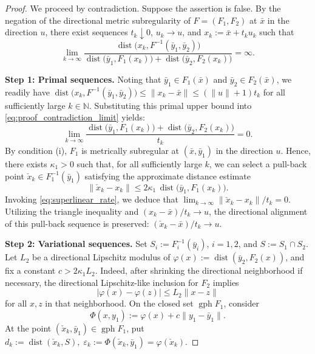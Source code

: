 \documentclass[12pt,twoside,reqno]{amsart}
\theoremstyle{definition}
\numberwithin{equation}{section}
\begin{document}
\begin{proof}
We proceed by contradiction. Suppose the assertion is false.  
By the negation of the directional metric subregularity of $F = (F_1, F_2)$ at $\bar{x}$ in the direction $u$, there exist sequences $t_k \downarrow 0$, $u_k \to u$, and $x_k := \bar{x} + t_k u_k$ such that 
\begin{equation} \label{eq:proof_contradiction_limit}
    \lim_{k \to \infty} \frac{\operatorname{dist}\big(x_k, F^{-1}(\bar{y}_1, \bar{y}_2)\big)}{\operatorname{dist}\big(\bar{y}_1, F_1(x_k)\big) + \operatorname{dist}\big(\bar{y}_2, F_2(x_k)\big)} = \infty.
\end{equation}

\textbf{Step 1: Primal sequences.} 
Noting that $\bar{y}_1 \in F_1(\bar{x})$ and $\bar{y}_2 \in F_2(\bar{x})$, we readily have $\operatorname{dist}\big(x_k, F^{-1}(\bar{y}_1, \bar{y}_2)\big) \le \|x_k - \bar{x}\| \le (\|u\| + 1)t_k$ for all sufficiently large $k \in \mathbb{N}$. Substituting this primal upper bound into \eqref{eq:proof_contradiction_limit} yields: 
\begin{equation} \label{eq:superlinear_rate}
    \lim_{k \to \infty} \frac{\operatorname{dist}\big(\bar{y}_1, F_1(x_k)\big) + \operatorname{dist}\big(\bar{y}_2, F_2(x_k)\big)}{t_k} = 0.
\end{equation}
By condition (i), $F_1$ is metrically subregular at $(\bar{x}, \bar{y}_1)$ in the direction $u$. Hence, there exists $\kappa_1 > 0$ such that, for all sufficiently large $k$, we can select a pull-back point $\check{x}_k \in F_1^{-1}(\bar{y}_1)$ satisfying the approximate distance estimate
\begin{equation} \label{eq:pullback_estimate}
    \|\check{x}_k - x_k\| \le 2\kappa_1 \, \operatorname{dist}\big(\bar{y}_1, F_1(x_k)\big).
\end{equation}
Invoking \eqref{eq:superlinear_rate}, we deduce that $\lim_{k\to\infty} \|\check{x}_k - x_k\|/t_k = 0$. Utilizing the triangle inequality and $(x_k - \bar{x})/t_k \to u$, the directional alignment of this pull-back sequence is preserved: $(\check{x}_k - \bar{x})/t_k \to u$. 

\textbf{Step 2: Variational sequences.}
Set $S_i:=F_i^{-1}(\bar{y}_i)$, $i=1,2$, and $S:=S_1\cap S_2$. Let $L_2$ be a directional Lipschitz modulus of $\varphi(x):=\operatorname{dist}(\bar{y}_2,F_2(x))$, 
and fix a constant $c>2\kappa_1L_2$. Indeed, after shrinking the directional neighborhood if necessary, the directional Lipschitz-like inclusion for $F_2$ implies
\[
    |\varphi(x)-\varphi(z)|\le L_2\|x-z\|
\]
for all $x,z$ in that neighborhood. On the closed set $\operatorname{gph}F_1$, consider
\[
    \Phi(x,y_1):=\varphi(x)+c\|y_1-\bar{y}_1\|.
\]
At the point $(\check x_k,\bar{y}_1)\in\operatorname{gph}F_1$, put $d_k:=\operatorname{dist}(\check x_k,S),\; \varepsilon_k:=\Phi(\check x_k,\bar{y}_1)=\varphi(\check x_k)$. 


\end{proof}
\end{document}
